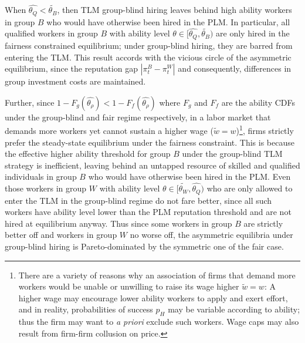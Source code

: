 \documentclass[sigconf]{acmart}
\theoremstyle{definition}
\begin{document}
When $\widehat{\theta_Q} < \widetilde{\theta_B}$, then TLM group-blind hiring leaves behind high ability workers in group $B$ who would have otherwise been hired in the PLM. In particular, all qualified workers in group $B$ with ability level $\theta \in [\widehat{\theta_Q}, \widetilde{\theta_B})$ are only hired in the fairness constrained equilibrium; under group-blind hiring, they are barred from entering the TLM. This result accords with the vicious circle of the asymmetric equilibrium, since the reputation gap $|\pi^B_t - \pi^W_t|$ and consequently, differences in group investment costs are maintained.


Further, since $1-F_g( \widehat{\theta_\rho}) < 1-F_f( \widehat{\theta_\rho})$ where $F_g$ and $F_f$ are the ability CDFs under the group-blind and fair regime respectively, in a labor market that demands more workers yet cannot sustain a higher wage ($\tilde{w} = w$)\footnote{There are a variety of reasons why an association of firms that demand more workers would be unable or unwilling to raise its wage higher $\tilde{w}=w$: A higher wage may encourage lower ability workers to apply and exert effort, and in reality, probabilities of success $p_H$ may be variable according to ability; thus the firm may want to \textit{a priori} exclude such workers. Wage caps may also result from firm-firm collusion on price.}, firms strictly prefer the steady-state equilibrium under the fairness constraint. This is because the effective higher ability threshold for group $B$ under the group-blind TLM strategy is inefficient, leaving behind an untapped resource of skilled and qualified individuals in group $B$ who would have otherwise been hired in the PLM. Even those workers in group $W$ with ability level $\theta \in [\widetilde{\theta_W}, \widehat{\theta_Q})$ who are only allowed to enter the TLM in the group-blind regime do not fare better, since all such workers have ability level lower than the PLM reputation threshold and are not hired at equilibrium anyway. Thus since some workers in group $B$ are strictly better off and workers in group $W$ no worse off, the asymmetric equilibria under group-blind hiring is Pareto-dominated by the symmetric one of the fair case. 
\end{document}
